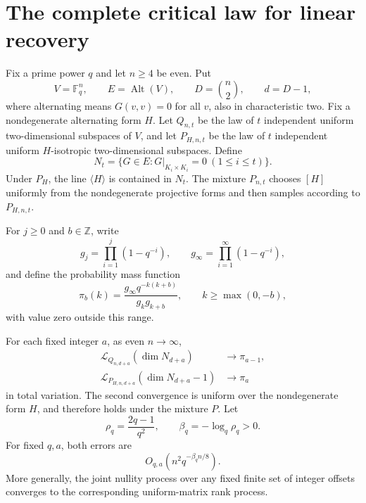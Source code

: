 
\section{The complete critical law for linear recovery}

Fix a prime power $q$ and let $n\ge4$ be even. Put
\[
 V=\mathbb F_q^n,\qquad E=\operatorname{Alt}(V),\qquad
 D=\binom n2,\qquad d=D-1,
\]
where alternating means $G(v,v)=0$ for all $v$, also in characteristic two.
Fix a nondegenerate alternating form $H$. Let $Q_{n,t}$ be the law of
$t$ independent uniform two-dimensional subspaces of $V$, and let
$P_{H,n,t}$ be the law of $t$ independent uniform $H$-isotropic
two-dimensional subspaces. Define
\[
 N_t=\{G\in E:G|_{K_i\times K_i}=0\ (1\le i\le t)\}.
\]
Under $P_H$, the line $\langle H\rangle$ is contained in $N_t$.
The mixture $P_{n,t}$ chooses $[H]$ uniformly from the nondegenerate
projective forms and then samples according to $P_{H,n,t}$.

For $j\ge0$ and $b\in\mathbb Z$, write
\[
 g_j=\prod_{i=1}^j(1-q^{-i}),\qquad
 g_\infty=\prod_{i=1}^{\infty}(1-q^{-i}),
\]
and define the probability mass function
\begin{equation}\label{crit:pi}
 \pi_b(k)=\frac{g_\infty q^{-k(k+b)}}{g_k g_{k+b}},
 \qquad k\ge\max(0,-b),
\end{equation}
with value zero outside this range.

\begin{theorem}\label{crit:main}
For each fixed integer $a$, as even $n\to\infty$,
\begin{align}
 \mathcal L_{Q_{n,d+a}}(\dim N_{d+a})&\longrightarrow\pi_{a-1},
 \label{crit:null}\\
 \mathcal L_{P_{H,n,d+a}}(\dim N_{d+a}-1)&\longrightarrow\pi_a
 \label{crit:plant}
\end{align}
in total variation. The second convergence is uniform over the
nondegenerate form $H$, and therefore holds under the mixture $P$.
Let
\[
 \rho_q=\frac{2q-1}{q^2},\qquad
 \beta_q=-\log_q\rho_q>0.
\]
For fixed $q,a$, both errors are
\begin{equation}\label{crit:rate}
 O_{q,a}\!\left(n^2q^{-\beta_q n/8}\right).
\end{equation}
More generally, the joint nullity process over any fixed finite set of
integer offsets converges to the corresponding uniform-matrix rank
process.
\end{theorem}


